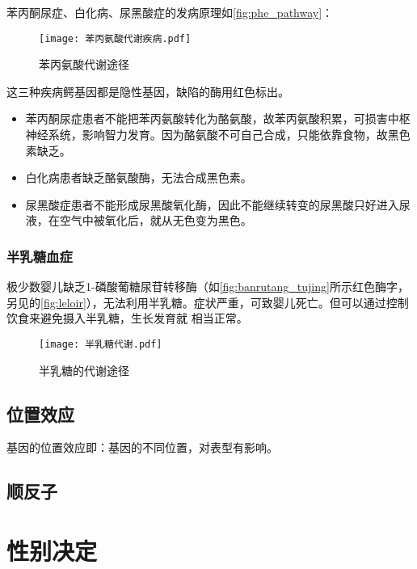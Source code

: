 苯丙酮尿症、白化病、尿黑酸症的发病原理如\autoref{fig:phe_pathway}：

\begin{figure}[htbp]
	\centering
	\texttt{[image: 苯丙氨酸代谢疾病.pdf]}
	\caption{苯丙氨酸代谢途径}
	\label{fig:phe_pathway}
\end{figure}

这三种疾病鳄基因都是隐性基因，缺陷的酶用{\color[RGB]{255,0,0}红色}标出。
\begin{itemize}
	\item 苯丙酮尿症患者不能把苯丙氨酸转化为酪氨酸，故苯丙氨酸积累，可损害中枢神经系统，影响智力发育。因为酪氨酸不可自己合成，只能依靠食物，故黑色素缺乏。
	\item 白化病患者缺乏酪氨酸酶，无法合成黑色素。
	\item 尿黑酸症患者不能形成尿黑酸氧化酶，因此不能继续转变的尿黑酸只好进入尿液，在空气中被氧化后，就从无色变为黑色。
\end{itemize}

\subsubsection{半乳糖血症}

极少数婴儿缺乏1-磷酸葡糖尿苷转移酶（如\autoref{fig:banrutang_tujing}所示红色{\color[RGB]{255,0,0}酶}字，另见的\autoref{fig:leloir}），无法利用半乳糖。症状严重，可致婴儿死亡。但可以通过控制饮食来避免摄入半乳糖，生长发育就	相当正常。

\begin{figure}[htbp]
	\centering
	\texttt{[image: 半乳糖代谢.pdf]}
	\caption{半乳糖的代谢途径}
	\label{fig:banrutang_tujing}
\end{figure}

\subsection{位置效应}

基因的位置效应即：基因的不同位置，对表型有影响。

\subsection{顺反子}



\section{性别决定}

